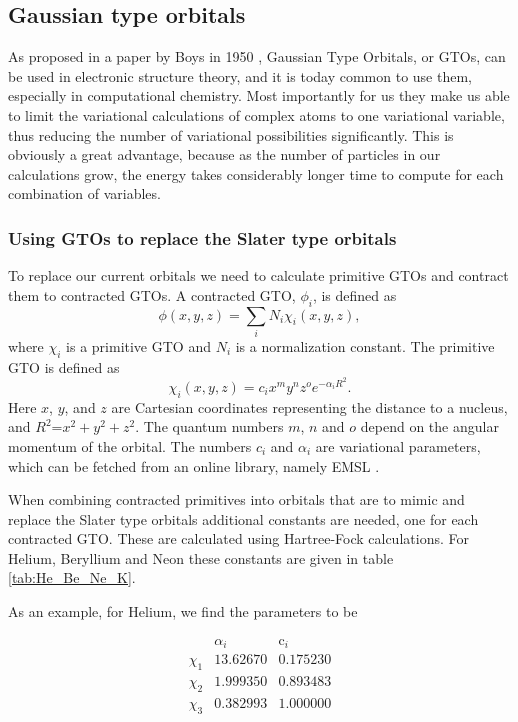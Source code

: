 
\subsection{Gaussian type orbitals}

As proposed in a paper by Boys in 1950 \parencite{Boys_1950},
Gaussian Type Orbitals, or GTOs, can be used in electronic structure
theory, and it is today common to use them, especially in computational
chemistry. Most importantly for us they make us able to limit the
variational calculations of complex atoms to one variational variable,
thus reducing the number of variational possibilities significantly.
This is obviously a great advantage, because as the number of particles
in our calculations grow, the energy takes considerably longer time
to compute for each combination of variables. 


\subsubsection{Using GTOs to replace the Slater type orbitals}

To replace our current orbitals we need to calculate primitive GTOs
and contract them to contracted GTOs. A contracted GTO, $\phi_{i}$,
is defined as
\[
\phi\left(x,y,z\right)=\sum_{i}N_{i}\chi_{i}\left(x,y,z\right),
\]
where $\chi_{i}$ is a primitive GTO and $N_{i}$ is a normalization
constant. The primitive GTO is defined as
\[
\chi_{i}\left(x,y,z\right)=c_{i}x^{m}y^{n}z^{o}e^{-\alpha_{i}R^{2}}.
\]
Here $x$, $y$, and $z$ are Cartesian coordinates representing the
distance to a nucleus, and $R^{2}$=$x^{2}+y^{2}+z^{2}$. The quantum
numbers $m$, $n$ and $o$ depend on the angular momentum of the
orbital. The numbers $c_{i}$ and $\alpha_{i}$ are variational parameters,
which can be fetched from an online library, namely EMSL \parencite{Binkley_1980}\parencite{EMSL}.

When combining contracted primitives into orbitals that are to mimic
and replace the Slater type orbitals additional constants are needed,
one for each contracted GTO. These are calculated using Hartree-Fock
calculations. For Helium, Beryllium and Neon these constants are given
in table \ref{tab:He_Be_Ne_K}. 


As an example, for Helium, we find the parameters to be

\[
\begin{array}{ccc}
 & \alpha_{i} & \mbox{c}_{i}\\
\chi_{1} & 13.62670 & 0.175230\\
\chi_{2} & 1.999350 & 0.893483\\
\chi_{3} & 0.382993 & 1.000000
\end{array}
\]

